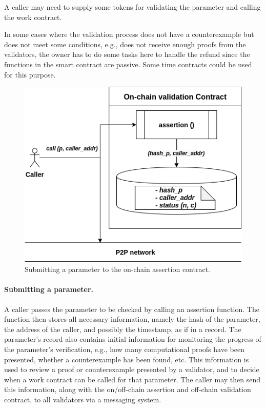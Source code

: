 \documentclass[runningheads]{llncs}
\begin{document}
A caller may need to supply some tokens for validating the parameter and calling the work contract. 

In some cases where the validation process does not have a counterexample but does not meet some conditions, e.g., does not receive enough proofs from the validators, the owner has to do some tasks here to handle the refund since the functions in the smart contract are passive. Some time contracts could be used for this purpose.


\begin{figure}
\centering
\includegraphics[scale=.6]{caller}
\caption{Submitting a parameter to the on-chain assertion contract.}
\end{figure}

\paragraph{Submitting a parameter.} A caller passes the parameter to be checked by calling an assertion function. The function then stores all necessary information, namely the hash of the parameter, the address of the caller, and possibly the timestamp, as if in a record. The parameter's record also contains initial information for monitoring the progress of the parameter's verification, e.g., how many computational proofs have been presented, whether a counterexample has been found, etc. This information is used to review a proof or counterexample presented by a validator, and to decide when a work contract can be called for that parameter. The caller may then send this information, along with the on/off-chain assertion and off-chain validation contract, to all validators via a messaging system.
\end{document}

